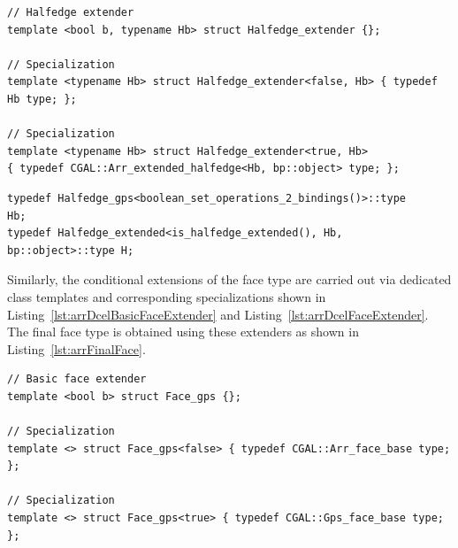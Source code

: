 \begin{lstfloat}
  \begin{lstlisting}[style=cppFramedStyle,basicstyle=\normalsize,%
                     label={lst:arrDcelHalfedgeExtender},%
                     caption={2D Arrangement DCEL user extended halfedge type extender.}]
// Halfedge extender
template <bool b, typename Hb> struct Halfedge_extender {};

// Specialization
template <typename Hb> struct Halfedge_extender<false, Hb> { typedef Hb type; };

// Specialization
template <typename Hb> struct Halfedge_extender<true, Hb> 
{ typedef CGAL::Arr_extended_halfedge<Hb, bp::object> type; };
  \end{lstlisting}
\end{lstfloat}

\begin{lstfloat}
  \begin{lstlisting}[style=cppFramedStyle,basicstyle=\normalsize,%
                     label={lst:arrFinalHalfedge},%
                     caption={The final 2D Arrangement DCEL halfedge type definition.}]
typedef Halfedge_gps<boolean_set_operations_2_bindings()>::type         Hb;
typedef Halfedge_extended<is_halfedge_extended(), Hb, bp::object>::type H;
  \end{lstlisting}
\end{lstfloat}

Similarly, the conditional extensions of the face type are carried out 
via dedicated class templates and corresponding specializations shown in 
Listing~\ref{lst:arrDcelBasicFaceExtender} and
Listing~\ref{lst:arrDcelFaceExtender}. The final face type is obtained
using these extenders as shown in Listing~\ref{lst:arrFinalFace}.
\begin{lstfloat}
  \begin{lstlisting}[style=cppFramedStyle,basicstyle=\normalsize,%
                     label={lst:arrDcelBasicFaceExtender},%
                     caption={2D Arrangement DCEL Face extender for 2D Regularized Boolean set operations.}]
// Basic face extender
template <bool b> struct Face_gps {};

// Specialization
template <> struct Face_gps<false> { typedef CGAL::Arr_face_base type; };

// Specialization
template <> struct Face_gps<true> { typedef CGAL::Gps_face_base type; };
  \end{lstlisting}
\end{lstfloat}

